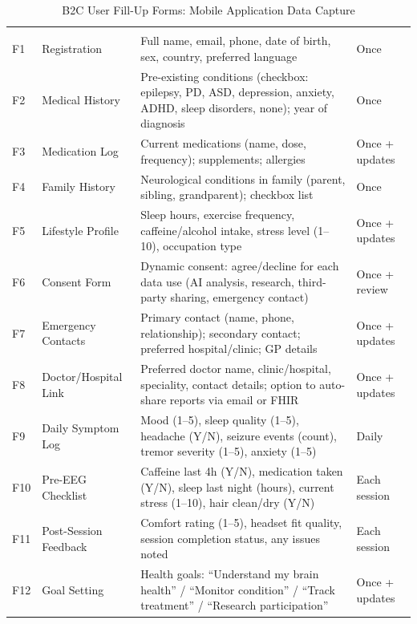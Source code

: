 {\tablestripes\tablefontsize
\begin{xltabular}{\textwidth}{@{} >{\raggedright\arraybackslash}p{0.6cm} >{\raggedright\arraybackslash}p{3.0cm} L >{\raggedright\arraybackslash}p{2.0cm} @{}}
\caption[B2C User Fill-Up Forms]{B2C User Fill-Up Forms: Mobile Application Data Capture}\label{tab:b2c_user_forms} \\
\toprule
\thead{\#} &  &  &  \\
\midrule
\endfirsthead
\toprule
\thead{\#} &  &  &  \\
\midrule
\endhead
\bottomrule
\endlastfoot
F1 & Registration & Full name, email, phone, date of birth, sex, country, preferred language & Once \\
\addlinespace
F2 & Medical History & Pre-existing conditions (checkbox: epilepsy, PD, ASD, depression, anxiety, ADHD, sleep disorders, none); year of diagnosis & Once \\
\addlinespace
F3 & Medication Log & Current medications (name, dose, frequency); supplements; allergies & Once + updates \\
\addlinespace
F4 & Family History & Neurological conditions in family (parent, sibling, grandparent); checkbox list & Once \\
\addlinespace
F5 & Lifestyle Profile & Sleep hours, exercise frequency, caffeine/alcohol intake, stress level (1--10), occupation type & Once + updates \\
\addlinespace
F6 & Consent Form & Dynamic consent: agree/decline for each data use (AI analysis, research, third-party sharing, emergency contact) & Once + review \\
\addlinespace
F7 & Emergency Contacts & Primary contact (name, phone, relationship); secondary contact; preferred hospital/clinic; GP details & Once + updates \\
\addlinespace
F8 & Doctor/Hospital Link & Preferred doctor name, clinic/hospital, speciality, contact details; option to auto-share reports via email or FHIR & Once + updates \\
\addlinespace
F9 & Daily Symptom Log & Mood (1--5), sleep quality (1--5), headache (Y/N), seizure events (count), tremor severity (1--5), anxiety (1--5) & Daily \\
\addlinespace
F10 & Pre-EEG Checklist & Caffeine last 4h (Y/N), medication taken (Y/N), sleep last night (hours), current stress (1--10), hair clean/dry (Y/N) & Each session \\
\addlinespace
F11 & Post-Session Feedback & Comfort rating (1--5), headset fit quality, session completion status, any issues noted & Each session \\
\addlinespace
F12 & Goal Setting & Health goals: ``Understand my brain health'' / ``Monitor condition'' / ``Track treatment'' / ``Research participation'' & Once + updates \\
\end{xltabular}}
